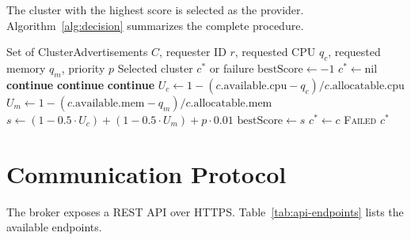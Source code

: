 The cluster with the highest score is selected as the provider. Algorithm~\ref{alg:decision} summarizes the complete procedure.

\begin{algorithm}[htbp]
\caption{Cluster Selection Algorithm}
\label{alg:decision}
\begin{algorithmic}[1]
\Require Set of ClusterAdvertisements $C$, requester ID $r$, requested CPU $q_c$, requested memory $q_m$, priority $p$
\Ensure Selected cluster $c^*$ or failure
\State $\text{bestScore} \gets -1$
\State $c^* \gets \text{nil}$
     \textbf{continue} 
    \EndIf
     \textbf{continue} 
    \EndIf
        \textbf{continue} 
    \EndIf
    \State $U_c \gets 1 - (c.\text{available.cpu} - q_c) / c.\text{allocatable.cpu}$
    \State $U_m \gets 1 - (c.\text{available.mem} - q_m) / c.\text{allocatable.mem}$
    \State $s \gets (1 - 0.5 \cdot U_c) + (1 - 0.5 \cdot U_m) + p \cdot 0.01$
        \State $\text{bestScore} \gets s$
        \State $c^* \gets c$
    \EndIf
\EndFor
{}
    \State \Return \textsc{Failed} 
\EndIf
\State \Return $c^*$
\end{algorithmic}
\end{algorithm}


\section{Communication Protocol}
\label{sec:protocol}

The broker exposes a REST API over HTTPS. Table~\ref{tab:api-endpoints} lists the available endpoints.

